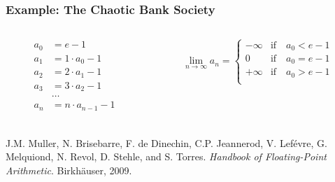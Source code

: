 \begin{frame}

\frametitle{Example: The Chaotic Bank Society\cite{muller-et-al-2009}}

\begin{columns}

\begin{column}{0.3\textwidth}

\begin{align*}
a_0 &= e-1 \\
a_1 &= 1 \cdot a_0 - 1 \\
a_2 &= 2 \cdot a_1 - 1 \\
a_3 &= 3 \cdot a_2 - 1 \\
    &\ldots \\
a_n &= n \cdot a_{n-1} - 1 \\
\end{align*}

\end{column}

\begin{column}{0.6\textwidth}

$$\lim_{n\to\infty} a_n =
\begin{cases}
-\infty & \text{if}\quad a_0 < e-1 \\
0 & \text{if}\quad a_0 = e-1 \\
+\infty & \text{if}\quad a_0 > e-1 \\
\end{cases}$$

\end{column}

\end{columns}

\vspace{\fill}

\footnotesize

\begin{thebibliography}{9}

 J.M. Muller, N. Brisebarre, F. de Dinechin, C.P.
Jeannerod, V. Lef\'evre, G. Melquiond, N. Revol, D. Stehle, and S. Torres.
\emph{Handbook of Floating-Point Arithmetic}. Birkh\"auser, 2009.

\end{thebibliography}

\end{frame}
